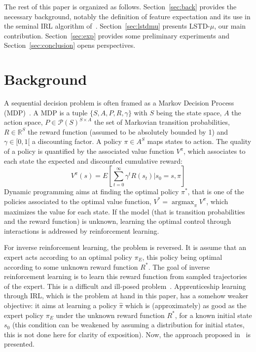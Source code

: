 \documentclass{article}
\newcommand{\argmax}{\operatorname*{argmax}} %
\begin{document}
The rest of this paper is organized as follows.
Section~\ref{sec:back} provides the necessary background,
notably the definition of feature expectation and its use in the
seminal IRL algorithm of~\citep{abbeel2004apprenticeship}.
Section~\ref{sec:lstdmu} presents LSTD-$\mu$, our main contribution.
Section~\ref{sec:exp} provides some preliminary experiments and
Section~\ref{sec:conclusion} opens perspectives.

\section{Background}
A sequential decision problem is often framed as a Markov Decision
Process (MDP)~\citep{puterman1994markov}. A MDP is a tuple
$\{S,A,P,R,\gamma\}$ with $S$ being the state space, $A$ the action
space, $P\in\mathcal{P}(S)^{S\times A}$ the set of Markovian
transition probabilities, $R\in\mathbb{R}^S$ the reward function
(assumed to be absolutely bounded by 1) and $\gamma\in[0,1[$ a
discounting factor. A policy $\pi\in A^S$ maps states to action. The
quality of a policy is quantified by the associated value function
$V^\pi$, which associates to each state the expected and discounted
cumulative reward:
\begin{equation}
  V^\pi(s) = E[\sum_{t=0}^\infty \gamma^t R(s_t)|s_0=s, \pi]
\end{equation}
Dynamic programming aims at finding the optimal policy $\pi^*$, that
is one of the policies associated to the optimal value function,
$V^* = \argmax_\pi V^\pi$, which maximizes the value for each state.
If the model (that is transition probabilities and the reward
function) is unknown, learning the optimal control through
interactions is addressed by reinforcement learning.

For inverse reinforcement learning, the problem is reversed. It is
assume that an expert acts according to an optimal policy $\pi_E$,
this policy being optimal according to some unknown reward function
$R^*$. The goal of inverse reinforcement learning is to learn this
reward function from sampled trajectories of the expert. This is a
difficult and ill-posed problem~\citep{ng2000algorithms}. Apprenticeship
learning through IRL, which is the problem at hand in this paper,
has a somehow weaker objective: it aims at learning a policy
$\hat{\pi}$ which is (approximately) as good as the expert policy
$\pi_E$ under the unknown reward function $R^*$, for a known initial
state $s_0$ (this condition can be weakened by assuming a
distribution for initial states, this is not done here for clarity
of exposition). Now, the approach proposed in~\citep{abbeel2004apprenticeship} is
presented.
\end{document}
